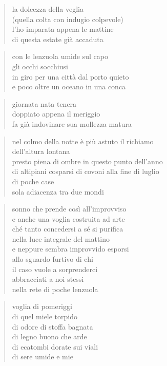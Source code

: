 \clearpage


\begin{verse}
    la dolcezza della veglia\\
    (quella colta con indugio colpevole)\\
    l'ho imparata appena le mattine\\
    di questa estate già accaduta
\end{verse}

\begin{verse}
    con le lenzuola umide sul capo\\
    gli occhi socchiusi\\
    in giro per una città dal porto quieto\\
    e poco oltre un oceano in una conca
\end{verse}

\clearpage


\begin{verse}
    giornata nata tenera\\
    doppiato appena il meriggio\\
    fa già indovinare sua mollezza matura
\end{verse}

\clearpage


\begin{verse}
    nel colmo della notte è più astuto il richiamo\\
    dell'altura lontana\\
    presto piena di ombre in questo punto dell'anno\\
    di altipiani cosparsi di covoni alla fine di luglio\\
    di poche case\\
    sola adiacenza tra due mondi
\end{verse}

\clearpage


\begin{verse}
    sonno che prende così all'improvviso\\
    e anche una voglia costruita ad arte\\
    ché tanto concedersi a sé si purifica\\
    nella luce integrale del mattino\\
    e neppure sembra improvvido esporsi\\
    allo sguardo furtivo di chi\\
    il caso vuole a sorprenderci\\
    abbracciati a noi stessi\\
    nella rete di poche lenzuola
\end{verse}

\clearpage


\begin{verse}
    voglia di pomeriggi\\
    di quel miele torpido\\
    di odore di stoffa bagnata\\
    di legno buono che arde\\
    di ecatombi dorate sui viali\\
    di sere umide e mie
\end{verse}
